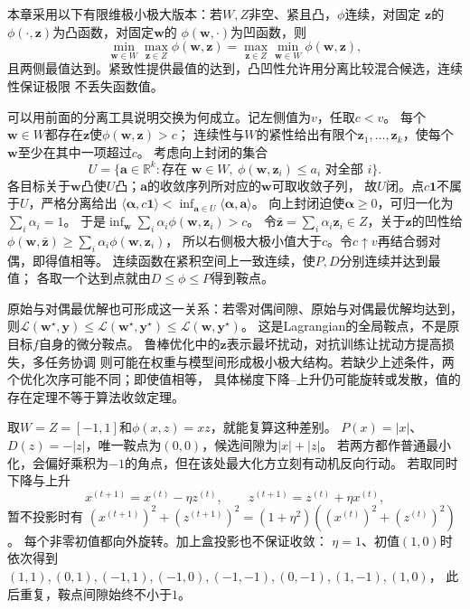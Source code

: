 本章采用以下有限维极小极大版本：若$W,Z$非空、紧且凸，$\phi$连续，对固定
$\bm{z}$的$\phi(\cdot,\bm{z})$为凸函数，对固定$\bm{w}$的
$\phi(\bm{w},\cdot)$为凹函数，则
\[
  \min_{\bm{w}\in W}\max_{\bm{z}\in Z}\phi(\bm{w},\bm{z})
  =
  \max_{\bm{z}\in Z}\min_{\bm{w}\in W}\phi(\bm{w},\bm{z}),
\]
且两侧最值达到。紧致性提供最值的达到，凸凹性允许用分离比较混合候选，连续性保证极限
不丢失函数值。

可以用前面的分离工具说明交换为何成立。记左侧值为$v$，任取$c<v$。
每个$\bm w\in W$都存在$\bm z$使$\phi(\bm w,\bm z)>c$；
连续性与$W$的紧性给出有限个$\bm z_1,\ldots,\bm z_k$，使每个$\bm w$至少在其中一项超过$c$。
考虑向上封闭的集合
\[
 U=\{\bm a\in\mathbb R^k:\text{存在 }\bm w\in W,\
          \phi(\bm w,\bm z_i)\leq a_i\text{ 对全部 }i\}.
\]
各目标关于$\bm w$凸使$U$凸；$\bm a$的收敛序列所对应的$\bm w$可取收敛子列，
故$U$闭。点$c\bm1$不属于$U$，严格分离给出
$\langle\bm\alpha,c\bm1\rangle<
\inf_{\bm a\in U}\langle\bm\alpha,\bm a\rangle$。
向上封闭迫使$\bm\alpha\geq0$，可归一化为$\sum_i\alpha_i=1$。
于是$\inf_{\bm w}\sum_i\alpha_i\phi(\bm w,\bm z_i)>c$。
令$\bar{\bm z}=\sum_i\alpha_i\bm z_i\in Z$，关于$\bm z$的凹性给
$\phi(\bm w,\bar{\bm z})\geq\sum_i\alpha_i\phi(\bm w,\bm z_i)$，
所以右侧极大极小值大于$c$。令$c\uparrow v$再结合弱对偶，即得值相等。
连续函数在紧积空间上一致连续，使$P,D$分别连续并达到最值；
各取一个达到点就由$D\leq\phi\leq P$得到鞍点。

原始与对偶最优解也可形成这一关系：若零对偶间隙、原始与对偶最优解均达到，
则$\mathcal L(\bm w^\star,\bm y)\leq
\mathcal L(\bm w^\star,\bm y^\star)\leq\mathcal L(\bm w,\bm y^\star)$。
这是Lagrangian的全局鞍点，不是原目标$f$自身的微分鞍点。
鲁棒优化中的$\bm{z}$表示最坏扰动，对抗训练让扰动方提高损失，多任务协调
则可能在权重与模型间形成极小极大结构。若缺少上述条件，两个优化次序可能不同；即使值相等，
具体梯度下降--上升仍可能旋转或发散，值的存在定理不等于算法收敛定理。

取$W=Z=[-1,1]$和$\phi(x,z)=xz$，就能复算这种差别。
$P(x)=|x|$、$D(z)=-|z|$，唯一鞍点为$(0,0)$，候选间隙为$|x|+|z|$。
若两方都作普通最小化，会偏好乘积为$-1$的角点，但在该处最大化方立刻有动机反向行动。
若取同时下降与上升
\[
 x^{(t+1)}=x^{(t)}-\eta z^{(t)},\qquad
 z^{(t+1)}=z^{(t)}+\eta x^{(t)},
\]
暂不投影时有
$(x^{(t+1)})^2+(z^{(t+1)})^2=(1+\eta^2)((x^{(t)})^2+(z^{(t)})^2)$。
每个非零初值都向外旋转。加上盒投影也不保证收敛：
$\eta=1$、初值$(1,0)$时依次得到
$(1,1),(0,1),(-1,1),(-1,0),(-1,-1),(0,-1),(1,-1),(1,0)$，
此后重复，鞍点间隙始终不小于$1$。

